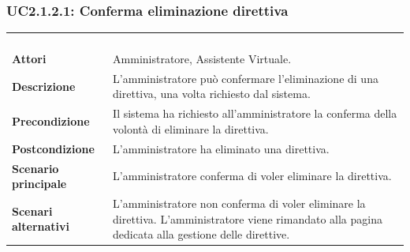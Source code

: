 \subsubsection{UC2.1.2.1: Conferma eliminazione direttiva}
\label{UC2.1.2.1}
\begin{longtable}{l|p{10cm}}
\rowcolor[gray]{0.8} \multicolumn{2}{c}{} \\
\rowcolor[gray]{0.8} \multicolumn{2}{c}{\textbf{UC2.1.2.1 - Conferma eliminazione direttiva}} \\
\rowcolor[gray]{0.8} \multicolumn{2}{c}{} \\
\hline
&\\
\textbf{Attori} & Amministratore, Assistente Virtuale.\\[7pt]
\textbf{Descrizione} & L'amministratore può confermare l'eliminazione di una direttiva, una volta richiesto dal sistema.\\[7pt]
\textbf{Precondizione} & Il sistema ha richiesto all'amministratore la conferma della volontà di eliminare la direttiva.\\[7pt]
\textbf{Postcondizione} & L'amministratore ha eliminato una direttiva.\\[7pt]
\textbf{Scenario principale} &L'amministratore conferma di voler eliminare la direttiva.\\[7pt]
\textbf{Scenari alternativi} & L'amministratore non conferma di voler eliminare la direttiva. L'amministratore viene rimandato alla pagina dedicata alla gestione delle direttive.\\[7pt]\hline
\end{longtable}

